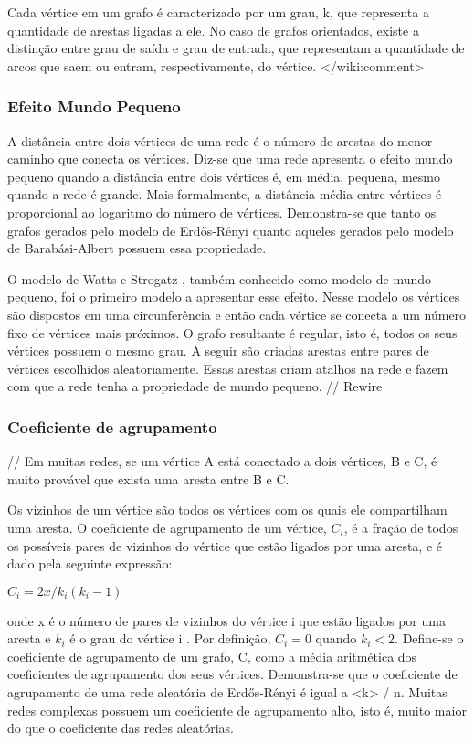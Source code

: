 \documentclass{article}
\begin{document}
Cada vértice em um grafo é caracterizado por um grau, k, que representa a quantidade de arestas ligadas a ele. No caso de grafos orientados, existe a distinção entre grau de saída e grau de entrada, que representam a quantidade de arcos que saem ou entram, respectivamente, do vértice.
</wiki:comment>

\subsubsection{Efeito Mundo Pequeno}

A distância entre dois vértices de uma rede é o número de arestas do menor caminho que conecta os vértices. Diz-se que uma rede apresenta o efeito mundo pequeno quando a distância entre dois vértices é, em média, pequena, mesmo quando a rede é grande. Mais formalmente, a distância média entre vértices é proporcional ao logaritmo do número de vértices. Demonstra-se que tanto os grafos gerados pelo modelo de Erdős-Rényi quanto aqueles gerados pelo modelo de Barabási-Albert possuem essa propriedade.

O modelo de Watts e Strogatz \cite{Watts1998}, também conhecido como modelo de mundo pequeno, foi o primeiro modelo a apresentar esse efeito. Nesse modelo os vértices são dispostos em uma circunferência e então cada vértice se conecta a um número fixo de vértices mais próximos. O grafo resultante é regular, isto é, todos os seus vértices possuem o mesmo grau. A seguir são criadas arestas entre pares de vértices escolhidos aleatoriamente. Essas arestas criam atalhos na rede e fazem com que a rede tenha a propriedade de mundo pequeno. // Rewire

\subsubsection{Coeficiente de agrupamento}

// Em muitas redes, se um vértice A está conectado a dois vértices, B e C, é muito provável que exista uma aresta entre B e C.

Os vizinhos de um vértice são todos os vértices com os quais ele compartilham uma aresta. O coeficiente de agrupamento de um vértice, $C_i$, é a fração de todos os possíveis pares de vizinhos do vértice que estão ligados por uma aresta, e é dado pela seguinte expressão:

$C_i = 2x / k_i(k_i - 1)$

onde x é o número de pares de vizinhos do vértice i que estão ligados por uma aresta e $k_i$ é o grau do vértice i \cite{Watts1998}. Por definição, $C_i = 0$ quando $k_i < 2$. Define-se o coeficiente de agrupamento de um grafo, C, como a média aritmética dos coeficientes de agrupamento dos seus vértices. Demonstra-se que o coeficiente de agrupamento de uma rede aleatória de Erdős-Rényi é igual a <k> / n. Muitas redes complexas possuem um coeficiente de agrupamento alto, isto é, muito maior do que o coeficiente das redes aleatórias.
\end{document}
